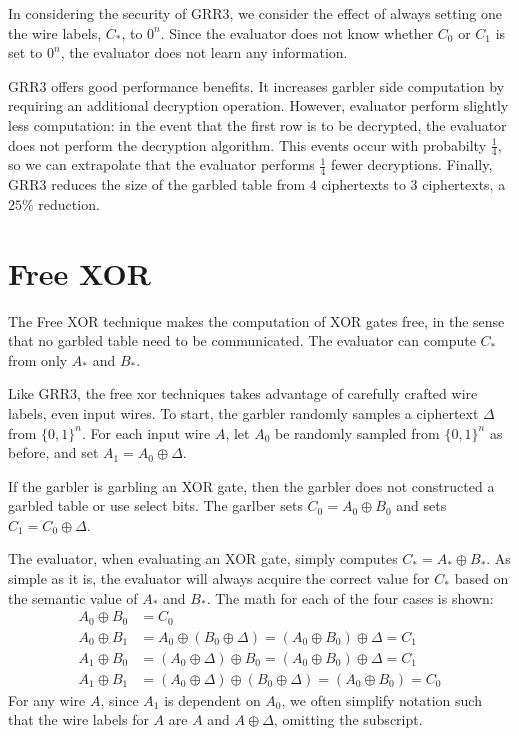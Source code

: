 In considering the security of GRR3, we consider the effect of always setting one the wire labels, $C_*$, to $0^n$.
Since the evaluator does not know whether $C_0$ or $C_1$ is set to $0^n$, the evaluator does not learn any information.

GRR3 offers good performance benefits.
It increases garbler side computation by requiring an additional decryption operation.
However, evaluator perform slightly less computation: in the event that the first row is to be decrypted, the evaluator does not perform the decryption algorithm. 
This events occur with probabilty $\frac{1}{4}$, so we can extrapolate that the evaluator performs $\frac{1}{4}$ fewer decryptions.
Finally, GRR3 reduces the size of the garbled table from $4$ ciphertexts to $3$ ciphertexts, a $25\%$ reduction.

\section{Free XOR}
The Free XOR technique makes the computation of XOR gates free, in the sense that no garbled table need to be communicated.
The evaluator can compute $C_*$ from only $A_*$ and $B_*$.

Like GRR3, the free xor techniques takes advantage of carefully crafted wire labels, even input wires.
To start, the garbler randomly samples a ciphertext $\Delta$ from $\{0,1\}^n$.
For each input wire $A$, let $A_0$ be randomly sampled from $\{0,1\}^n$ as before, and set $A_1 = A_0 \oplus \Delta$.

If the garbler is garbling an XOR gate, then the garbler does not constructed a garbled table or use select bits.
The garlber sets $C_0 = A_0 \oplus B_0$ and sets $C_1 = C_0 \oplus \Delta$.

The evaluator, when evaluating an XOR gate, simply computes $C_* = A_* \oplus B_*$.
As simple as it is, the evaluator will always acquire the correct value for $C_*$ based on the semantic value of $A_*$ and $B_*$.
The math for each of the four cases is shown:
\begin{align*}
    A_0 \oplus B_0 & = C_0 \\
    A_0 \oplus B_1 & = A_0 \oplus (B_0 \oplus \Delta) = (A_0 \oplus B_0) \oplus \Delta = C_1 \\
    A_1 \oplus B_0 & = (A_0 \oplus \Delta) \oplus B_0 = (A_0 \oplus B_0) \oplus \Delta = C_1 \\
    A_1 \oplus B_1 & = (A_0 \oplus \Delta) \oplus (B_0 \oplus \Delta) = (A_0 \oplus B_0) = C_0
\end{align*}
For any wire $A$, since $A_1$ is dependent on $A_0$, we often simplify notation such that the wire labels for $A$ are $A$ and $A \oplus \Delta$, omitting the subscript.

